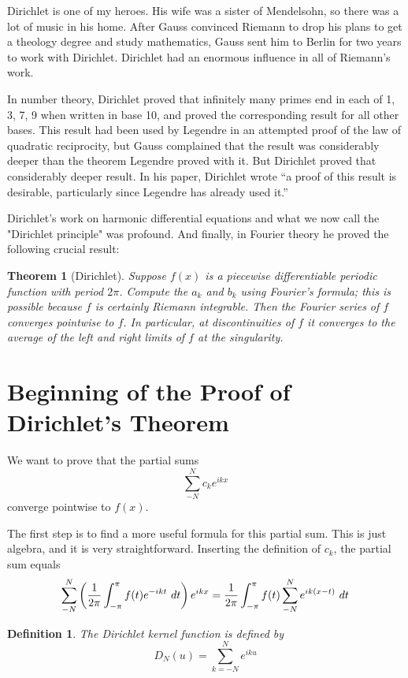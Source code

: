 \documentclass[11pt, oneside]{amsart}
\newtheorem{theorem}{Theorem}
\newtheorem{definition}{Definition}
\begin{document}
Dirichlet is one of my heroes. His wife was a sister of Mendelsohn, so there was a lot of music in his home. After Gauss convinced Riemann to drop his plans to get a theology degree and  study mathematics, Gauss  sent him to Berlin for two years to work with Dirichlet. Dirichlet had an enormous influence in all of Riemann's work. 

In number theory, Dirichlet proved that infinitely many primes end in each of 1, 3, 7, 9 when written in base 10, and proved the corresponding result for all other bases. This result had been used by Legendre in an attempted proof of the law of quadratic reciprocity, but Gauss complained that the result was considerably deeper than the theorem Legendre proved with it. But Dirichlet proved that considerably deeper result. In his paper, Dirichlet wrote ``a proof of this result is desirable, particularly since Legendre has already used it.''

Dirichlet's work on harmonic differential equations and what we now call the "Dirichlet principle" was profound. And  finally, in Fourier theory he proved the following crucial result:

\begin{theorem}[Dirichlet]
Suppose $f(x)$ is a piecewise differentiable periodic function with period $2 \pi$. Compute the $a_k$ and $b_k$ using Fourier's formula; this is possible because $f$ is certainly Riemann integrable. Then the Fourier series of $f$ converges pointwise to $f$. In particular, at discontinuities of $f$ it converges to the average of the left and right limits of $f$ at the singularity.
\end{theorem}



\section{Beginning of the Proof of Dirichlet's Theorem}


We want to prove that the partial sums
$$\sum_{-N}^N c_k e^{ikx}$$
converge pointwise to $f(x)$.

The first step is to find a more useful formula for this partial sum. This is just algebra, and it is very straightforward. Inserting the definition of $c_k$, the partial sum equals
$$\sum_{-N}^N \left({1 \over {2 \pi}} \int_{- \pi}^\pi  f(t) e^{-ikt} \ dt\right) e^{ikx} = {1 \over {2 \pi}} \int_{- \pi}^\pi f(t) \sum_{-N}^N e^{i k (x - t)} \ dt$$

\begin{definition}
The Dirichlet kernel function is defined by
$$D_N(u) = \sum_{k = -N}^N e^{iku}$$
\end{definition}
\end{document}
